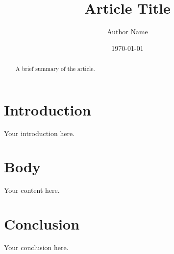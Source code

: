 \documentclass[12pt]{article}
\title{Article Title}
\author{Author Name}
\date{\today}
\begin{document}
\maketitle

\begin{abstract}
A brief summary of the article.
\end{abstract}

\section{Introduction}
Your introduction here.

\section{Body}
Your content here.

\section{Conclusion}
Your conclusion here.
\end{document}
